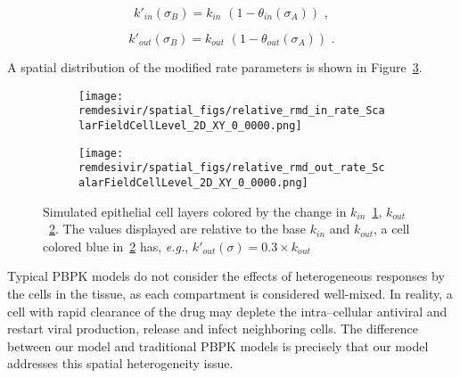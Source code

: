 \begin{equation}\label{eq:remdes:intercell:mod_kin_minus}
    k'_{in}(\sigma_B) = k_{in} \,\, (1-\theta_{in}(\sigma_A))\,\,,
\end{equation}

\begin{equation}\label{eq:remdes:intercell:mod_kout_minus}
    k'_{out}(\sigma_B) = k_{out} \,\, (1-\theta_{out}(\sigma_A))\,\,.
\end{equation}

\noindent A spatial distribution of the modified rate parameters is shown in Figure~\ref{fig:remdes:met:intercell_rates}.

\begin{figure}[H]
\centering
\begin{subfigure}{0.45\textwidth}
\texttt{[image: remdesivir/spatial\_figs/relative\_rmd\_in\_rate\_ScalarFieldCellLevel\_2D\_XY\_0\_0000.png]}
\caption{}\label{fig:remdes:met:intercell_rates:kin}
\end{subfigure}
\begin{subfigure}{0.45\textwidth}
\texttt{[image: remdesivir/spatial\_figs/relative\_rmd\_out\_rate\_ScalarFieldCellLevel\_2D\_XY\_0\_0000.png]}
\caption{}\label{fig:remdes:met:intercell_rates:kout}
\end{subfigure}
\caption{Simulated epithelial cell layers colored by the change in $k_{in}$~\ref{fig:remdes:met:intercell_rates:kin},  $k_{out}$~\ref{fig:remdes:met:intercell_rates:kout}. The values displayed are relative to the base $k_{in}$ and $k_{out}$, a cell colored blue in~\ref{fig:remdes:met:intercell_rates:kout} has, \emph{e.g.}, $k'_{out}(\sigma) = 0.3\times k_{out}$}\label{fig:remdes:met:intercell_rates}
\end{figure}

 Typical PBPK models do not consider the effects of heterogeneous responses by the cells in the tissue, as each compartment is considered well-mixed. In reality, a cell with rapid clearance of the drug may deplete the intra--cellular antiviral and restart viral production, release and infect neighboring cells. The difference between our model and traditional PBPK models is precisely that our model addresses this spatial heterogeneity issue.
 

